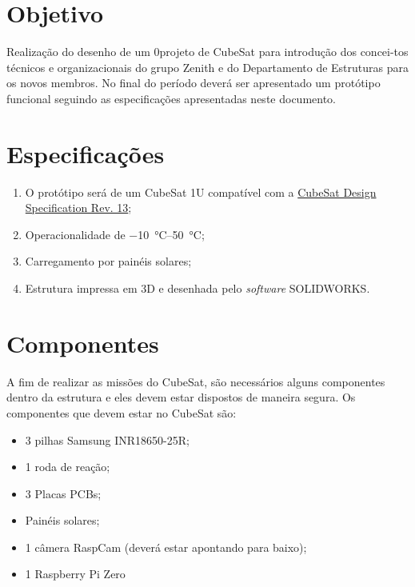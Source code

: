 \documentclass[brazilian, 12pt, oneside, a4paper]{article}
\begin{document}
\setFaixa
\geraTitulo


\section*{Objetivo} %

Realização do desenho de um 0projeto de CubeSat para introdução dos concei-tos técnicos e organizacionais do grupo Zenith e do Departamento de Estruturas para os novos membros. No final do período deverá ser apresentado um protótipo funcional seguindo as especificações apresentadas neste documento.

\section*{Especificações}

\begin{enumerate}
    \item O protótipo será de um CubeSat 1U compatível com a \href{https://static1.squarespace.com/static/5418c831e4b0fa4ecac1bacd/t/56e9b62337013b6c063a655a/1458157095454/cds_rev13_final2.pdf}{CubeSat Design Specification Rev. 13};
    \item Operacionalidade de \SIrange{-10}{50}{\celsius}; %
    \item Carregamento por painéis solares;
    \item Estrutura impressa em 3D e desenhada pelo \textit{software} SOLIDWORKS.
\end{enumerate}

\section*{Componentes}

A fim de realizar as missões do CubeSat, são necessários alguns componentes dentro da estrutura e eles devem estar dispostos de maneira segura. Os componentes que devem estar no CubeSat são:
\begin{itemize}[label=--]
    \item 3 pilhas Samsung INR18650-25R;
    \item 1 roda de reação;
    \item 3 Placas PCBs;
    \item Painéis solares;
    \item 1 câmera RaspCam (deverá estar apontando para baixo);
    \item 1 Raspberry Pi Zero
\end{itemize}
\end{document}
